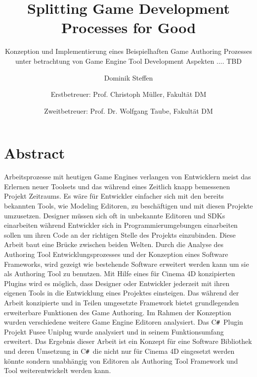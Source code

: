 \documentclass[pagesize, paper=a4, fontsize=12pt, titlepage=true, headings=small, headnosepline, abstractoff, liststotoc, nochapterprefix, plainheadsepline, twoside]{scrreprt}
\author{
Dominik Steffen \and
Erstbetreuer: Prof. Christoph Müller, Fakultät DM \and
Zweitbetreuer: Prof. Dr. Wolfgang Taube, Fakultät DM
}
\title{Splitting Game Development Processes for Good}
\subtitle{Konzeption und Implementierung eines Beispielhaften Game Authoring Prozesses unter betrachtung von Game Engine Tool Development Aspekten .... TBD}
\newcommand{\CSS}{C\texttt{\# }}
\begin{document}



\newpage
\thispagestyle{empty}
\mbox{}

\begingroup
\newpage
\pagestyle{empty}
\renewcommand*{\chapterpagestyle}{empty}
\chapter*{Abstract}%
Arbeitsprozesse mit heutigen Game Engines verlangen von Entwicklern meist das Erlernen neuer Toolsets und das während eines Zeitlich knapp bemessenen Projekt Zeitraums. Es wäre für Entwickler einfacher sich mit den bereits bekannten Tools, wie Modeling Editoren, zu beschäftigen und mit diesen Projekte umzusetzen. Designer müssen sich oft in unbekannte Editoren und SDKs einarbeiten während Entwickler sich in Programmierumgebungen einarbeiten sollen um ihren Code an der richtigen Stelle des Projekts einzubinden.
Diese Arbeit baut eine Brücke zwischen beiden Welten. Durch die Analyse des Authoring Tool Entwicklungsprozesses und der Konzeption eines Software Frameworks, wird gezeigt wie bestehende Software erweitert werden kann um sie als Authoring Tool zu benutzen. Mit Hilfe eines für Cinema 4D konzipierten Plugins wird es möglich, dass Designer oder Entwickler jederzeit mit ihren eigenen Tools in die Entwicklung eines Projektes einsteigen. Das während der Arbeit konzipierte und in Teilen umgesetzte Framework bietet grundlegenden erweiterbare Funktionen des Game Authoring. Im Rahmen der Konzeption wurden verschiedene weitere Game Engine Editoren analysiert. Das \CSS Plugin Projekt Fusee Uniplug wurde analysiert und in seinem Funktionsumfang erweitert. Das Ergebnis dieser Arbeit ist ein Konzept für eine Software Bibliothek und deren Umsetzung in \CSS die nicht nur für Cinema 4D eingesetzt werden könnte sondern unabhängig von Editoren als Authoring Tool Framework und Tool weiterentwickelt werden kann.

\clearpage
\endgroup
\end{document}
